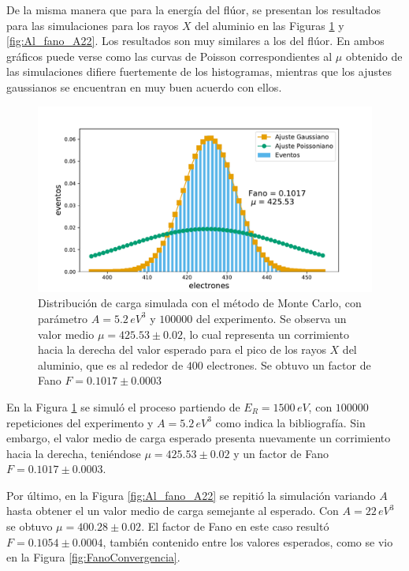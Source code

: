 De la misma manera que para la energía del flúor, se presentan los resultados para las simulaciones para los rayos $X$ del aluminio en las Figuras \ref{fig:Al_fano_A5.2} y \ref{fig:Al_fano_A22}. Los resultados son muy similares a los del flúor. En ambos gráficos puede verse como las curvas de Poisson correspondientes al $\mu$ obtenido de las simulaciones difiere fuertemente de los histogramas, mientras que los ajustes gaussianos se encuentran en muy buen acuerdo con ellos. 
\begin{figure}[h]
    \centering
    \includegraphics[scale=0.5]{Figs/Al_Fano_1500_A5.2_Eloss0_100ktrials.pdf}
    \caption{Distribución de carga simulada con el método de Monte Carlo, con parámetro $A = 5.2\,\si{eV}^{3}$ y $100000$ del experimento. Se observa un valor medio $\mu = 425.53 \pm 0.02$, lo cual representa un corrimiento hacia la derecha del valor esperado para el pico de los rayos $X$ del aluminio, que es al rededor de $400$ electrones. Se obtuvo un factor de Fano $F = 0.1017 \pm 0.0003$}
    \label{fig:Al_fano_A5.2}
\end{figure}

En la Figura \ref{fig:Al_fano_A5.2} se simuló el proceso partiendo de $E_{R} = 1500\,\si{eV}$, con $100000$ repeticiones del experimento y $A = 5.2\,\si{eV}^{3}$ como indica la bibliografía. Sin embargo, el valor medio de carga esperado presenta nuevamente un corrimiento hacia la derecha, teniéndose $\mu = 425.53 \pm 0.02$ y un factor de Fano $F = 0.1017 \pm 0.0003$.

Por último, en la Figura \ref{fig:Al_fano_A22} se repitió la simulación variando $A$ hasta obtener el un valor medio de carga semejante al esperado. Con $A = 22\,\si{eV}^{3}$ se obtuvo $\mu = 400.28 \pm 0.02$. El factor de Fano en este caso resultó $F = 0.1054 \pm 0.0004$, también contenido entre los valores esperados, como se vio en la Figura \ref{fig:FanoConvergencia}.

